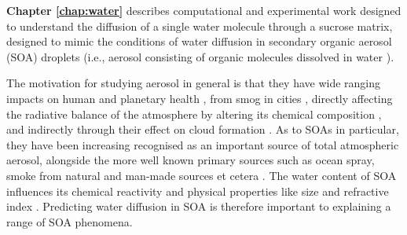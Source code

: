 \textbf{Chapter \ref{chap:water}} describes computational and experimental work designed to understand the diffusion of a single water molecule through a sucrose matrix, designed to mimic the conditions of water diffusion in secondary organic aerosol (SOA) droplets  \cite{songTransientCavityDynamics2020a} (i.e., aerosol consisting of organic molecules dissolved in water \cite[chapter 1]{stepheningramCausesMagnitudesAtmospheric2019}). 


The motivation for studying aerosol in general is that they have wide ranging impacts on human and planetary health \cite{Ingram2017}, from smog in cities \cite{StopDenyingRisks2019}, directly affecting the radiative balance of the atmosphere by altering its chemical composition \cite{irvineHalvingWarmingIdealized2019}, and indirectly through their effect on cloud formation \cite{farmerAtmosphericProcessesTheir2015}. As to SOAs in particular, they have been increasing recognised as an important source of total atmospheric aerosol, alongside the more well known primary sources such as ocean spray, smoke from natural and man-made sources et cetera \cite{mcconnellSeasonalVariationsPhysical2008}. The water content of SOA influences its chemical reactivity \cite{varutbangkulHygroscopicitySecondaryOrganic2006} and physical properties like size and refractive index \cite{steimerElectrodynamicBalanceMeasurements2015,tangSimultaneousDeterminationRefractive1991}. Predicting water diffusion in SOA is therefore important to explaining a range of SOA phenomena. 

